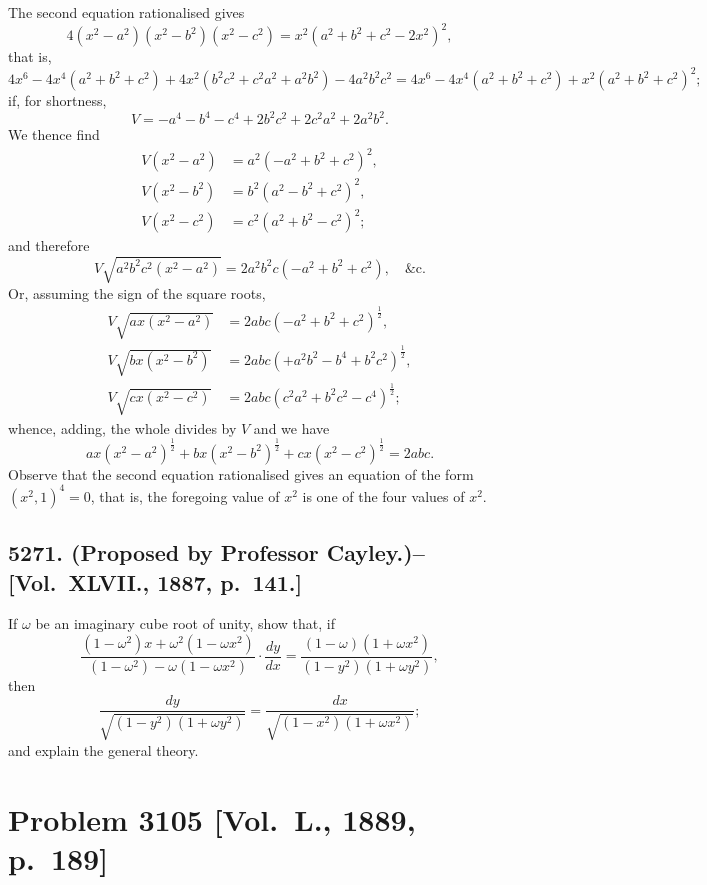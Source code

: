 \documentclass[11pt,a4paper]{book}
\begin{document}
\begin{solution}
The second equation rationalised gives
\[
4(x^2-a^2)(x^2-b^2)(x^2-c^2) = x^2(a^2+b^2+c^2-2x^2)^2,
\]
that is,
\[
4x^6 - 4x^4(a^2+b^2+c^2) + 4x^2(b^2c^2+c^2a^2+a^2b^2) - 4a^2b^2c^2 = 4x^6 - 4x^4(a^2+b^2+c^2) + x^2(a^2+b^2+c^2)^2;
\]
if, for shortness,
\[
V = -a^4-b^4-c^4+2b^2c^2+2c^2a^2+2a^2b^2.
\]
We thence find
\[
\begin{aligned}
V(x^2-a^2) &= a^2(-a^2+b^2+c^2)^2, \\
V(x^2-b^2) &= b^2(a^2-b^2+c^2)^2, \\
V(x^2-c^2) &= c^2(a^2+b^2-c^2)^2;
\end{aligned}
\]
and therefore
\[
V\sqrt{a^2b^2c^2(x^2-a^2)} = 2a^2b^2c(-a^2+b^2+c^2), \quad \&\text{c.}
\]
Or, assuming the sign of the square roots,
\[
\begin{aligned}
V\sqrt{ax(x^2-a^2)} &= 2abc(-a^2+b^2+c^2)^{\frac{1}{2}}, \\
V\sqrt{bx(x^2-b^2)} &= 2abc(+a^2b^2-b^4+b^2c^2)^{\frac{1}{2}}, \\
V\sqrt{cx(x^2-c^2)} &= 2abc(c^2a^2+b^2c^2-c^4)^{\frac{1}{2}};
\end{aligned}
\]
whence, adding, the whole divides by $V$ and we have
\[
ax(x^2-a^2)^{\frac{1}{2}} + bx(x^2-b^2)^{\frac{1}{2}} + cx(x^2-c^2)^{\frac{1}{2}} = 2abc.
\]
Observe that the second equation rationalised gives an equation of the form $(x^2,1)^4=0$, that is, the foregoing value of $x^2$ is one of the four values of $x^2$.
\end{solution}

\newpage

\subsection*{5271. (Proposed by Professor Cayley.)\---[Vol.~XLVII., 1887, p.~141.]}

If $\omega$ be an imaginary cube root of unity, show that, if
\[
\frac{(1-\omega^2)x + \omega^2(1-\omega x^2)}{(1-\omega^2) - \omega(1-\omega x^2)} \cdot \frac{dy}{dx} = \frac{(1-\omega)(1+\omega x^2)}{(1-y^2)(1+\omega y^2)},
\]
then
\[
\frac{dy}{\sqrt{(1-y^2)(1+\omega y^2)}} = \frac{dx}{\sqrt{(1-x^2)(1+\omega x^2)}};
\]
and explain the general theory.

\newpage

\section*{Problem 3105 [Vol.~L., 1889, p.~189]}
\end{document}
